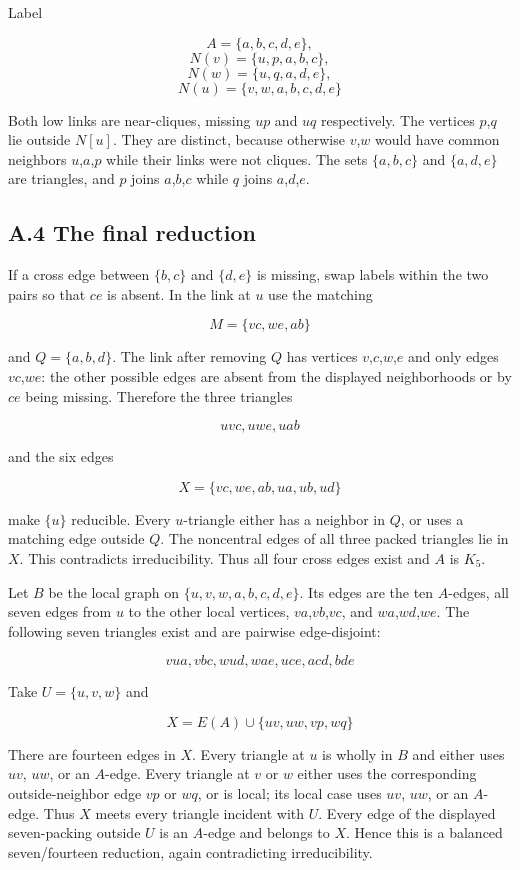 \documentclass[11pt]{article}
\begin{document}
Label

\[A=\{a,b,c,d,e\},\] \[N(v)=\{u,p,a,b,c\},\] \[N(w)=\{u,q,a,d,e\},\]
\[N(u)=\{v,w,a,b,c,d,e\}\]

Both low links are near-cliques, missing \(up\) and \(uq\) respectively.
The vertices \(p\),\(q\) lie outside \(N[u]\). They are distinct,
because otherwise \(v\),\(w\) would have common neighbors
\(u\),\(a\),\(p\) while their links were not cliques. The sets
\(\{a,b,c\}\) and \(\{a,d,e\}\) are triangles, and \(p\) joins
\(a\),\(b\),\(c\) while \(q\) joins \(a\),\(d\),\(e\).

\subsection{A.4 The final reduction}\label{a.4-the-final-reduction}

If a cross edge between \(\{b,c\}\) and \(\{d,e\}\) is missing, swap
labels within the two pairs so that \(ce\) is absent. In the link at
\(u\) use the matching

\[M=\{vc,we,ab\}\]

and \(Q=\{a,b,d\}\). The link after removing \(Q\) has vertices
\(v\),\(c\),\(w\),\(e\) and only edges \(vc\),\(we\): the other possible
edges are absent from the displayed neighborhoods or by \(ce\) being
missing. Therefore the three triangles

\[uvc, uwe, uab\]

and the six edges

\[X=\{vc,we,ab,ua,ub,ud\}\]

make \(\{u\}\) reducible. Every \(u\)-triangle either has a neighbor in
\(Q\), or uses a matching edge outside \(Q\). The noncentral edges of
all three packed triangles lie in \(X\). This contradicts
irreducibility. Thus all four cross edges exist and \(A\) is \(K_5\).

Let \(B\) be the local graph on \(\{u,v,w,a,b,c,d,e\}\). Its edges are
the ten \(A\)-edges, all seven edges from \(u\) to the other local
vertices, \(va\),\(vb\),\(vc\), and \(wa\),\(wd\),\(we\). The following
seven triangles exist and are pairwise edge-disjoint:

\[vua, vbc, wud, wae, uce, acd, bde\]

Take \(U=\{u,v,w\}\) and

\[X=E(A)\cup \{uv,uw,vp,wq\}\]

There are fourteen edges in \(X\). Every triangle at \(u\) is wholly in
\(B\) and either uses \(uv\), \(uw\), or an \(A\)-edge. Every triangle
at \(v\) or \(w\) either uses the corresponding outside-neighbor edge
\(vp\) or \(wq\), or is local; its local case uses \(uv\), \(uw\), or an
\(A\)-edge. Thus \(X\) meets every triangle incident with \(U\). Every
edge of the displayed seven-packing outside \(U\) is an \(A\)-edge and
belongs to \(X\). Hence this is a balanced seven/fourteen reduction,
again contradicting irreducibility.
\end{document}
